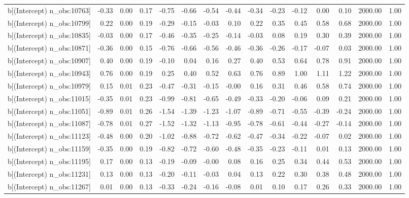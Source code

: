 \begin{table}[ht]
\begin{tabular}{rrrrrrrrrrrrrrr}
  b[(Intercept) n\_obs:10763] & -0.33 & 0.00 & 0.17 & -0.75 & -0.66 & -0.54 & -0.44 & -0.34 & -0.23 & -0.12 & 0.00 & 0.10 & 2000.00 & 1.00 \\ 
  b[(Intercept) n\_obs:10799] & 0.22 & 0.00 & 0.19 & -0.29 & -0.15 & -0.03 & 0.10 & 0.22 & 0.35 & 0.45 & 0.58 & 0.68 & 2000.00 & 1.00 \\ 
  b[(Intercept) n\_obs:10835] & -0.03 & 0.00 & 0.17 & -0.46 & -0.35 & -0.25 & -0.14 & -0.03 & 0.08 & 0.19 & 0.30 & 0.39 & 2000.00 & 1.00 \\ 
  b[(Intercept) n\_obs:10871] & -0.36 & 0.00 & 0.15 & -0.76 & -0.66 & -0.56 & -0.46 & -0.36 & -0.26 & -0.17 & -0.07 & 0.03 & 2000.00 & 1.00 \\ 
  b[(Intercept) n\_obs:10907] & 0.40 & 0.00 & 0.19 & -0.10 & 0.04 & 0.16 & 0.27 & 0.40 & 0.53 & 0.64 & 0.78 & 0.91 & 2000.00 & 1.00 \\ 
  b[(Intercept) n\_obs:10943] & 0.76 & 0.00 & 0.19 & 0.25 & 0.40 & 0.52 & 0.63 & 0.76 & 0.89 & 1.00 & 1.11 & 1.22 & 2000.00 & 1.00 \\ 
  b[(Intercept) n\_obs:10979] & 0.15 & 0.01 & 0.23 & -0.47 & -0.31 & -0.15 & -0.00 & 0.16 & 0.31 & 0.46 & 0.58 & 0.74 & 2000.00 & 1.00 \\ 
  b[(Intercept) n\_obs:11015] & -0.35 & 0.01 & 0.23 & -0.99 & -0.81 & -0.65 & -0.49 & -0.33 & -0.20 & -0.06 & 0.09 & 0.21 & 2000.00 & 1.00 \\ 
  b[(Intercept) n\_obs:11051] & -0.89 & 0.01 & 0.26 & -1.54 & -1.39 & -1.23 & -1.07 & -0.89 & -0.71 & -0.55 & -0.39 & -0.24 & 2000.00 & 1.00 \\ 
  b[(Intercept) n\_obs:11087] & -0.78 & 0.01 & 0.27 & -1.52 & -1.32 & -1.13 & -0.95 & -0.78 & -0.61 & -0.44 & -0.27 & -0.14 & 2000.00 & 1.00 \\ 
  b[(Intercept) n\_obs:11123] & -0.48 & 0.00 & 0.20 & -1.02 & -0.88 & -0.72 & -0.62 & -0.47 & -0.34 & -0.22 & -0.07 & 0.02 & 2000.00 & 1.00 \\ 
  b[(Intercept) n\_obs:11159] & -0.35 & 0.00 & 0.19 & -0.82 & -0.72 & -0.60 & -0.48 & -0.35 & -0.23 & -0.11 & 0.01 & 0.13 & 2000.00 & 1.00 \\ 
  b[(Intercept) n\_obs:11195] & 0.17 & 0.00 & 0.13 & -0.19 & -0.09 & -0.00 & 0.08 & 0.16 & 0.25 & 0.34 & 0.44 & 0.53 & 2000.00 & 1.00 \\ 
  b[(Intercept) n\_obs:11231] & 0.13 & 0.00 & 0.13 & -0.20 & -0.11 & -0.03 & 0.04 & 0.13 & 0.22 & 0.30 & 0.38 & 0.48 & 2000.00 & 1.00 \\ 
  b[(Intercept) n\_obs:11267] & 0.01 & 0.00 & 0.13 & -0.33 & -0.24 & -0.16 & -0.08 & 0.01 & 0.10 & 0.17 & 0.26 & 0.33 & 2000.00 & 1.00 \\ 

\end{tabular}
\end{table}
